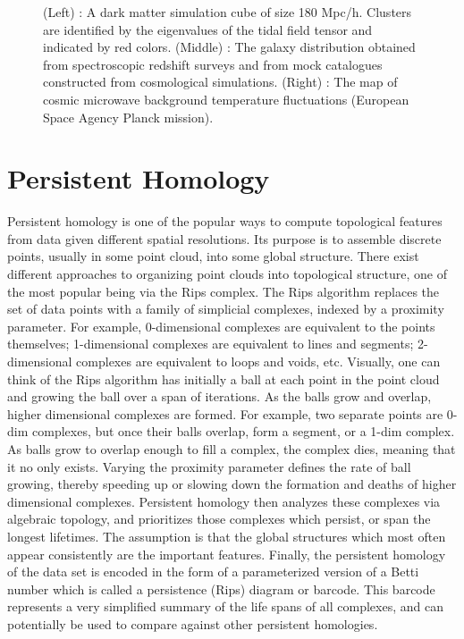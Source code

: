 \documentclass[12pt]{article}
\begin{document}
\begin{figure}[!htb]
\endminipage\hfill
\caption{(Left) : A dark matter simulation cube of size 180 Mpc/h. Clusters are identified by the eigenvalues of the tidal field tensor and indicated by red colors. (Middle) : The galaxy distribution obtained from spectroscopic redshift surveys and from mock catalogues constructed from cosmological simulations. (Right) : The map of cosmic microwave background temperature fluctuations (European Space Agency Planck mission). }
\end{figure}

\section{Persistent Homology}
Persistent homology is one of the popular ways to compute topological features from data given different spatial resolutions. Its purpose is to assemble discrete points, usually in some point cloud, into some global structure. There exist different approaches to organizing point clouds into topological structure, one of the most popular being via the Rips complex. The Rips algorithm replaces the set of data points with a family of simplicial complexes, indexed by a proximity parameter. For example, 0-dimensional complexes are equivalent to the points themselves; 1-dimensional complexes are equivalent to lines and segments; 2-dimensional complexes are equivalent to loops and voids, etc. Visually, one can think of the Rips algorithm has initially a ball at each point in the point cloud and growing the ball over a span of iterations. As the balls grow and overlap, higher dimensional complexes are formed. For example, two separate points are 0-dim complexes, but once their balls overlap, form a segment, or a 1-dim complex. As balls grow to overlap enough to fill a complex, the complex dies, meaning that it no only exists. Varying the proximity parameter defines the rate of ball growing, thereby speeding up or slowing down the formation and deaths of higher dimensional complexes. Persistent homology then analyzes these complexes via algebraic topology, and prioritizes those complexes which persist, or span the longest lifetimes. The assumption is that the global structures which most often appear consistently are the important features. Finally, the persistent homology of the data set is encoded in the form of a parameterized version of a Betti number which is called a persistence (Rips) diagram or barcode. This barcode represents a very simplified summary of the life spans of all complexes, and can potentially be used to compare against other persistent homologies.
\end{document}
